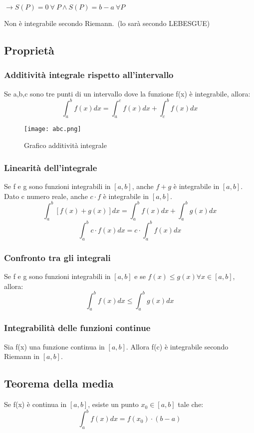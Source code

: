 \documentclass[../../main.tex]{subfiles}
\begin{document}
$\rightarrow S(P) = 0 \ \forall \ P \land S(P) = b-a \ \forall P$

Non è integrabile secondo Riemann.\ (lo sarà secondo LEBESGUE)

\newpage
\subsection{Proprietà}
\subsubsection{Additività integrale rispetto all'intervallo}
Se a,b,c sono tre punti di un intervallo dove la funzione f(x) è integrabile,
allora:\[\int_a^b f(x)dx = \int_a^c f(x)dx + \int_c^b f(x)dx\]

\begin{figure}[ht]
    \centering
    \texttt{[image: abc.png]}
    \caption{Grafico additività integrale}\label{fig:additivita-integrale}
\end{figure}

\subsubsection{Linearità dell'integrale}
Se f e g sono funzioni integrabili in $[a, b]$, anche $f+g$ è integrabile in
$[a, b]$. Dato c numero reale, anche $c\cdot f$ è integrabile in $[a, b]$.
\[\int_a^b [f(x)+g(x)]dx = \int_a^b f(x)dx + \int_a^b g(x)dx\]\[\int_a^b
    c\cdot f(x)dx = c\cdot\int_a^b f(x)dx\]

\subsubsection{Confronto tra gli integrali}
Se f e g sono funzioni integrabili in $[a, b]$ e se $f(x) \leq g(x) \forall x
    \in [a, b]$, allora:\[\int_a^b f(x)dx \leq \int_a^b g(x)dx\]

\subsubsection{Integrabilità delle funzioni continue}
Sia f(x) una funzione continua in $[a, b]$. Allora f(c) è integrabile secondo
Riemann in $[a, b]$.

\subsection{Teorema della media}
Se f(x) è continua in $[a, b]$, esiste un punto $x_0 \in [a, b]$ tale che:
\[\int_a^b f(x)dx = f(x_0)\cdot(b-a)\]
\end{document}
